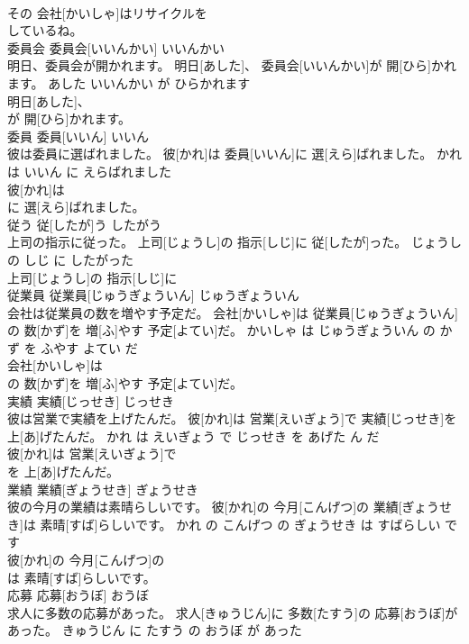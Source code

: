 \documentclass[8pt]{extreport}
\begin{document}
\begin{CJK}{UTF8}{min}
\\	その 会社[かいしゃ]はリサイクルを
\\	しているね。			
\\	委員会	委員会[いいんかい]	いいんかい	
\\	明日、委員会が開かれます。	明日[あした]、 委員会[いいんかい]が 開[ひら]かれます。	あした いいんかい が ひらかれます	
\\	明日[あした]、
\\	が 開[ひら]かれます。			
\\	委員	委員[いいん]	いいん	
\\	彼は委員に選ばれました。	彼[かれ]は 委員[いいん]に 選[えら]ばれました。	かれ は いいん に えらばれました	
\\	彼[かれ]は
\\	に 選[えら]ばれました。			
\\	従う	従[したが]う	したがう	
\\	上司の指示に従った。	上司[じょうし]の 指示[しじ]に 従[したが]った。	じょうし の しじ に したがった	
\\	上司[じょうし]の 指示[しじ]に
\\	従業員	従業員[じゅうぎょういん]	じゅうぎょういん	
\\	会社は従業員の数を増やす予定だ。	会社[かいしゃ]は 従業員[じゅうぎょういん]の 数[かず]を 増[ふ]やす 予定[よてい]だ。	かいしゃ は じゅうぎょういん の かず を ふやす よてい だ	
\\	会社[かいしゃ]は
\\	の 数[かず]を 増[ふ]やす 予定[よてい]だ。			
\\	実績	実績[じっせき]	じっせき	
\\	彼は営業で実績を上げたんだ。	彼[かれ]は 営業[えいぎょう]で 実績[じっせき]を 上[あ]げたんだ。	かれ は えいぎょう で じっせき を あげた ん だ	
\\	彼[かれ]は 営業[えいぎょう]で
\\	を 上[あ]げたんだ。			
\\	業績	業績[ぎょうせき]	ぎょうせき	
\\	彼の今月の業績は素晴らしいです。	彼[かれ]の 今月[こんげつ]の 業績[ぎょうせき]は 素晴[すば]らしいです。	かれ の こんげつ の ぎょうせき は すばらしい です	
\\	彼[かれ]の 今月[こんげつ]の
\\	は 素晴[すば]らしいです。			
\\	応募	応募[おうぼ]	おうぼ	
\\	求人に多数の応募があった。	求人[きゅうじん]に 多数[たすう]の 応募[おうぼ]があった。	きゅうじん に たすう の おうぼ が あった	

\end{CJK}
\end{document}
